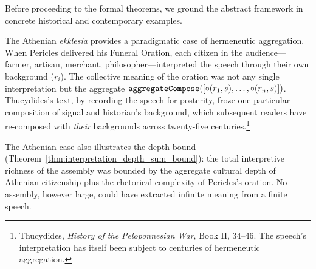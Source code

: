 Before proceeding to the formal theorems, we ground the abstract framework
in concrete historical and contemporary examples.

\begin{example}
\label{ex:athenian_assembly}
The Athenian \textit{ekklesia} provides a paradigmatic case of hermeneutic
aggregation.  When Pericles delivered his Funeral Oration, each citizen in
the audience---farmer, artisan, merchant, philosopher---interpreted the
speech through their own background ($r_i$).  The collective meaning of the
oration was not any single interpretation but the aggregate
$\texttt{aggregateCompose}([\circ(r_1, s), \ldots, \circ(r_n, s)])$.
Thucydides's text, by recording the speech for posterity, froze one
particular composition of signal and historian's background, which
subsequent readers have re-composed with \textit{their} backgrounds
across twenty-five centuries.\footnote{Thucydides, \textit{History of
the Peloponnesian War}, Book II, 34--46.  The speech's interpretation
has itself been subject to centuries of hermeneutic aggregation.}

The Athenian case also illustrates the depth bound
(Theorem~\ref{thm:interpretation_depth_sum_bound}): the total interpretive
richness of the assembly was bounded by the aggregate cultural depth of
Athenian citizenship plus the rhetorical complexity of Pericles's oration.
No assembly, however large, could have extracted infinite meaning from a
finite speech.
\end{example}

